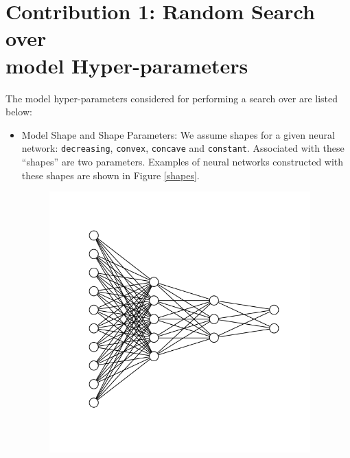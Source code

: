 \documentclass[12pt]{article}
\begin{document}
\section{Contribution 1: Random Search over\\ model Hyper-parameters}
\begin{flushleft}
The model hyper-parameters considered for performing a search over are listed below:
\begin{itemize}

\item Model Shape and Shape Parameters: We assume shapes for a given neural network: \texttt{decreasing}, \texttt{convex}, \texttt{concave} and \texttt{constant}. Associated with these ``shapes'' are two parameters. Examples of neural networks constructed with these shapes are shown in Figure \ref{shapes}.
\begin{figure}[ht]
\begin{minipage}{0.24\linewidth}
\centering
\includegraphics[width=0.95\textwidth]{decreasing-eg.png}
\end{minipage}
\begin{minipage}{0.24\linewidth}
\centering

\end{minipage}
\end{figure}
\end{itemize}
\end{flushleft}
\end{document}

